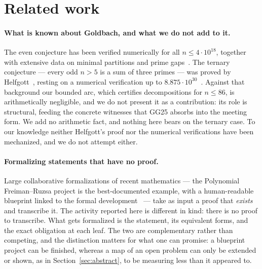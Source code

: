 \documentclass[11pt]{article}
\theoremstyle{remark}\newtheorem{remark}{Remark}
\begin{document}
\section{Related work}
\label{sec:related}

\paragraph{What is known about Goldbach, and what we do not add to it.} The even
conjecture has been verified numerically for all $n \le 4 \cdot 10^{18}$, together with
extensive data on minimal partitions and prime gaps~\cite{oesilva2014goldbach}. The
ternary conjecture --- every odd $n > 5$ is a sum of three primes --- was proved by
Helfgott~\cite{helfgott2013ternary}, resting on a numerical verification up to
$8.875 \cdot 10^{30}$~\cite{helfgott2013numerical}. Against that background our bounded
arc, which certifies decompositions for $n \le 86$, is arithmetically negligible, and we
do not present it as a contribution: its role is structural, feeding the concrete
witnesses that GG25 absorbs into the meeting form. We add no arithmetic fact, and
nothing here bears on the ternary case. To our knowledge neither Helfgott's proof nor
the numerical verifications have been mechanized, and we do not attempt either.

\paragraph{Formalizing statements that have no proof.} Large collaborative
formalizations of recent mathematics --- the Polynomial Freiman--Ruzsa project is the
best-documented example, with a human-readable blueprint linked to the formal
development~\cite{tao2023pfr} --- take as input a proof that \emph{exists} and transcribe
it. The activity reported here is different in kind: there is no proof to transcribe.
What gets formalized is the statement, its equivalent forms, and the exact obligation at
each leaf. The two are complementary rather than competing, and the distinction matters
for what one can promise: a blueprint project can be finished, whereas a map of an open
problem can only be extended or shown, as in Section~\ref{sec:abstract}, to be measuring
less than it appeared to.
\end{document}
